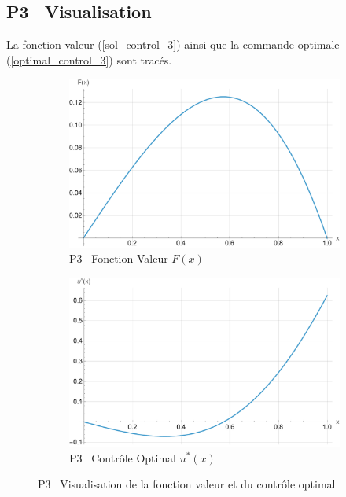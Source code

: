 \subsection{P3 \textemdash~Visualisation}
La fonction valeur (\ref{sol_control_3}) ainsi que la commande optimale (\ref{optimal_control_3}) sont tracés.
\begin{figure}[htb]
    \centering
    \begin{subfigure}{0.45\linewidth}
        \includegraphics[width=\linewidth]{img/validation/P3/p3_value.pdf}
        \caption{P3 \textemdash~Fonction Valeur $F(x)$}\label{fig:ValueVisualisation3}
    \end{subfigure}
    \hfill
    \begin{subfigure}{0.45\linewidth}
        \includegraphics[width=\linewidth]{img/validation/P3/p3_control.pdf}
        \caption{P3 \textemdash~Contrôle Optimal $u^*(x)$}\label{fig:ControlVisualisation3}
    \end{subfigure}
    \caption{P3 \textemdash~Visualisation de la fonction valeur et du contrôle optimal}\label{fig:ValueControlComparison3}
\end{figure}
